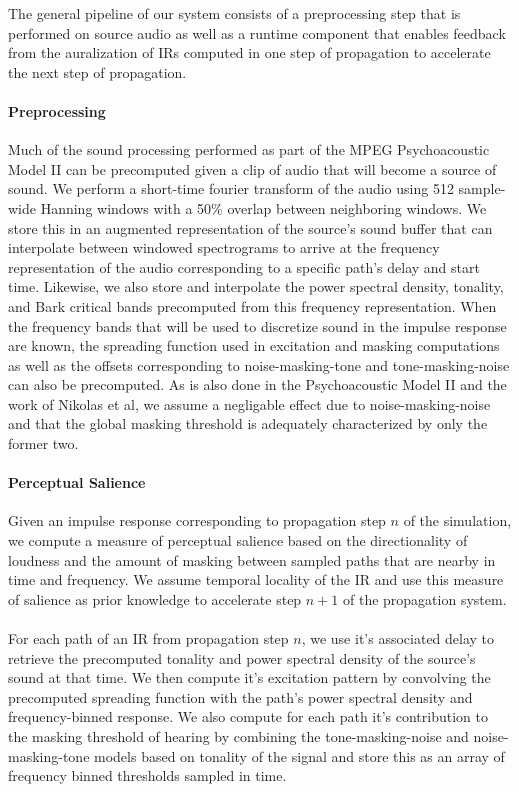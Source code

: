 The general pipeline of our system consists of a preprocessing step that is performed on source audio
as well as a runtime component that enables feedback from the auralization of IRs computed in one step of 
propagation to accelerate the next step of propagation.
\paragraph{Preprocessing}
Much of the sound processing performed as part of the MPEG Psychoacoustic Model II can be precomputed 
given a clip of audio that will become a source of sound.
We perform a short-time fourier transform of the audio using 512 sample-wide Hanning windows with a 
50\% overlap between neighboring windows.
We store this in an augmented representation of the source's sound buffer that can interpolate between 
windowed spectrograms to arrive at the frequency representation of the audio corresponding to a specific 
path's delay and start time.
Likewise, we also store and interpolate the power spectral density, tonality, and Bark critical bands 
precomputed from this frequency representation.
When the frequency bands that will be used to discretize sound in the impulse response are known, the 
spreading function used in excitation and masking computations as well as the offsets corresponding 
to noise-masking-tone and tone-masking-noise can also be precomputed.
As is also done in the Psychoacoustic Model II and the work of Nikolas et al, we assume a negligable 
effect due to noise-masking-noise and that the global masking threshold is adequately characterized 
by only the former two.
\paragraph{Perceptual Salience}
Given an impulse response corresponding to propagation step $n$ of the simulation, we compute a measure 
of perceptual salience based on the directionality of loudness and the amount of masking between sampled 
paths that are nearby in time and frequency.
We assume temporal locality of the IR and use this measure of salience as prior knowledge to accelerate 
step $n+1$ of the propagation system.
\paragraph{}
For each path of an IR from propagation step $n$, we use it's associated delay to retrieve the precomputed tonality
and power spectral density of the source's sound at that time.
We then compute it's excitation pattern by convolving the precomputed spreading function with the path's power 
spectral density and frequency-binned response.
We also compute for each path it's contribution to the masking threshold of hearing by combining the tone-masking-noise and noise-masking-tone models based on tonality of the signal and store this as an array
of frequency binned thresholds sampled in time.
